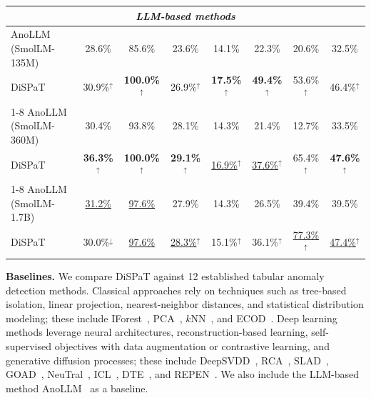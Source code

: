 \begin{table}[t]
\begin{tabular}{l c c c c c c c}
\midrule
\multicolumn{8}{c}{\textit{LLM-based methods}} \\
\midrule
AnoLLM (SmolLM-135M) & 28.6\% & 85.6\% & 23.6\% & 14.1\% & 22.3\% & 20.6\% & 32.5\% \\
DiSPaT               & 30.9\%$^{\uparrow}$ & \textbf{100.0\%}$^{\uparrow}$ & 26.9\%$^{\uparrow}$ & \textbf{17.5\%}$^{\uparrow}$ & \textbf{49.4\%}$^{\uparrow}$ & 53.6\%$^{\uparrow}$ & 46.4\%$^{\uparrow}$ \\
\cmidrule{1-8}
AnoLLM (SmolLM-360M) & 30.4\% & 93.8\% & 28.1\% & 14.3\% & 21.4\% & 12.7\%  & 33.5\% \\
DiSPaT               & \textbf{36.3\%}$^{\uparrow}$ & \textbf{100.0\%}$^{\uparrow}$ & \textbf{29.1\%}$^{\uparrow}$ & \underline{16.9\%}$^{\uparrow}$ & \underline{37.6\%}$^{\uparrow}$ & 65.4\%$^{\uparrow}$ & \textbf{47.6\%}$^{\uparrow}$ \\
\cmidrule{1-8}
AnoLLM (SmolLM-1.7B) & \underline{31.2\%} & \underline{97.6\%} & 27.9\% & 14.3\% & 26.5\% & 39.4\%  & 39.5\% \\
DiSPaT               & 30.0\%$^{\downarrow}$ & \underline{97.6\%} & \underline{28.3\%}$^{\uparrow}$ & 15.1\%$^{\uparrow}$ & 36.1\%$^{\uparrow}$ & \underline{77.3\%}$^{\uparrow}$ & \underline{47.4\%}$^{\uparrow}$ \\
\bottomrule
\end{tabular}
\end{table}


\textbf{Baselines.}
We compare DiSPaT against 12 established tabular anomaly detection methods. Classical approaches rely on techniques such as tree-based isolation, linear projection, nearest-neighbor distances, and statistical distribution modeling; these include IForest~\citep{liu2008iforest}, PCA~\citep{shyu2003pca}, $k$NN~\citep{ramaswamy2000knn}, and ECOD~\citep{li2022ecod}. Deep learning methods leverage neural architectures, reconstruction-based learning, self-supervised objectives with data augmentation or contrastive learning, and generative diffusion processes; these include DeepSVDD~\citep{ruff2018deepsvdd}, RCA~\citep{liu2021rca}, SLAD~\citep{xu2023fascinating}, GOAD~\citep{bergman2020goad}, NeuTral~\citep{qiu2021neutral}, ICL~\citep{shenkar2022anomaly}, DTE~\citep{livernoche2024dte}, and REPEN~\citep{pang2018repen}. 
We also include the LLM-based method AnoLLM~\citep{tsai2025anollm} as a baseline. 

